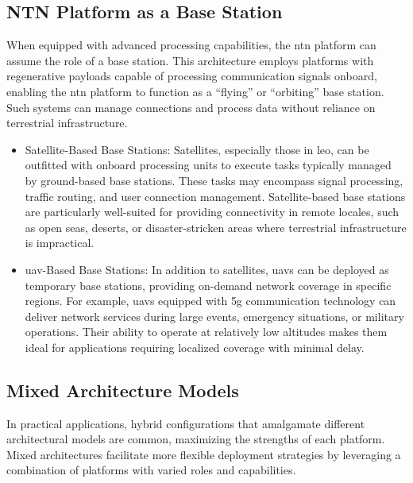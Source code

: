\subsection{NTN Platform as a Base Station}\label{subsec:ntn_platform_as_a_base_station}

When equipped with advanced processing capabilities, the \gls{ntn} platform can assume the role of a base station. This architecture employs platforms with regenerative payloads capable of processing communication signals onboard, enabling the \gls{ntn} platform to function as a ``flying'' or ``orbiting'' base station. Such systems can manage connections and process data without reliance on terrestrial infrastructure.

\begin{itemize}
  \item Satellite-Based Base Stations: Satellites, especially those in \gls{leo}, can be outfitted with onboard processing units to execute tasks typically managed by ground-based base stations. These tasks may encompass signal processing, traffic routing, and user connection management. Satellite-based base stations are particularly well-suited for providing connectivity in remote locales, such as open seas, deserts, or disaster-stricken areas where terrestrial infrastructure is impractical.

  \item \gls{uav}-Based Base Stations: In addition to satellites, \glspl{uav} can be deployed as temporary base stations, providing on-demand network coverage in specific regions. For example, \glspl{uav} equipped with \gls{5g} communication technology can deliver network services during large events, emergency situations, or military operations. Their ability to operate at relatively low altitudes makes them ideal for applications requiring localized coverage with minimal delay.
\end{itemize}

\subsection{Mixed Architecture Models}\label{subsec:mixed_architecture_models}

In practical applications, hybrid configurations that amalgamate different architectural models are common, maximizing the strengths of each platform. Mixed architectures facilitate more flexible deployment strategies by leveraging a combination of platforms with varied roles and capabilities.

